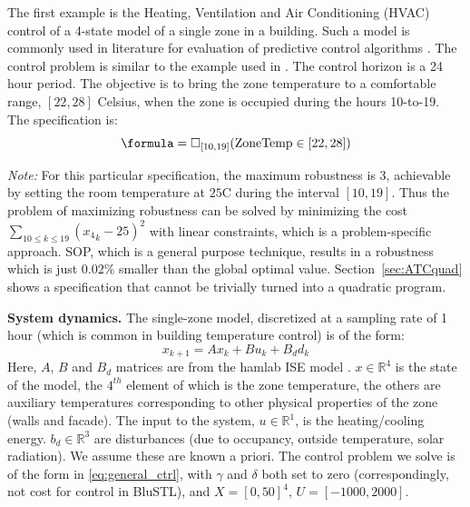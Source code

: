 
The first example is the Heating, Ventilation and Air Conditioning (HVAC) control of a 4-state model of a single zone in a building. Such a model is commonly used in literature for evaluation of predictive control algorithms \cite{Jain2016}. 
The control problem is similar to the example used in \cite{Raman14_MPCSTL}.
The control horizon is a 24 hour period.
The objective is to bring the zone temperature to a comfortable range, $[22,28]$ Celsius, when the zone is occupied during the hours 10-to-19. 
The specification is:
\begin{equation}
\label{eq:BldgSpec}
\formula = \always_{[10,19]}(\text{ZoneTemp} \in [22,28])
\end{equation}

\textit{Note:} For this particular specification, the maximum robustness is $3$, achievable by setting the room temperature at $25$C during the interval $[10,19]$.
Thus the problem of maximizing robustness can be solved by minimizing the cost $\sum_{10\leq k \leq 19}({x_4}_k-25)^2$ with linear constraints,
which is a problem-specific approach.
SOP, which is a general purpose technique, results in a robustness which is just $0.02\%$ smaller than the global optimal value. 
Section~\ref{sec:ATCquad} shows a specification that cannot be trivially turned into a quadratic program.

\textbf{System dynamics.} The single-zone model, discretized at a sampling rate of 1 hour (which is common in building temperature control) is of the form:
\begin{equation}
\label{eq:bldg_dyn}
x_{k+1} = Ax_{k}+Bu_k+B_dd_k
\end{equation}
Here, $A$, $B$ and $B_d$ matrices are from the hamlab ISE model \cite{VanSchijndel2005}. $x \in \mathbb{R}^4$ is the state of the model, the $4^{th}$ element of which is the zone temperature, the others are auxiliary temperatures corresponding to other physical properties of the zone (walls and facade). The input to the system, $u \in \mathbb{R}^1$, is the heating/cooling energy. $b_d \in \mathbb{R}^3$ are disturbances (due to occupancy, outside temperature, solar radiation). We assume these are known a priori.
The control problem we solve is of the form in \eqref{eq:general_ctrl}, with $\gamma$ and $\delta$ both set to zero (correspondingly, not cost for control in BluSTL), and $X=[0,50]^4$, $U=[-1000,2000]$.

